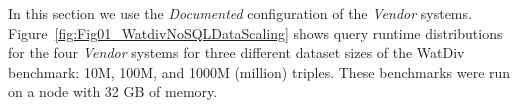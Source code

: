 %
%
In this section we use the \emph{Documented} configuration of the \emph{Vendor} systems.
Figure~\ref{fig:Fig01_WatdivNoSQLDataScaling} shows query runtime distributions for the four \emph{Vendor} systems for three different dataset sizes of the WatDiv benchmark: 10M, 100M, and 1000M (million) triples. These benchmarks were run on a node with 32 GB of memory.
%
%
%  

